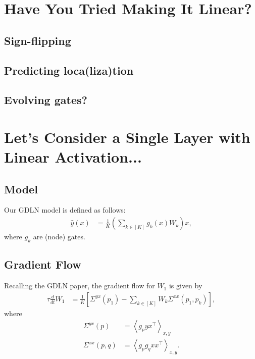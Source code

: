 \documentclass{article}
\begin{document}
\section{Have You Tried Making It Linear?}
\subsection{Sign-flipping}

\subsection{Predicting loca(liza)tion}

\subsection{Evolving gates?}


\section{Let's Consider a Single Layer with Linear Activation...}

\subsection{Model}
Our GDLN model is defined as follows:
\begin{align}
  \hat{y}(x) &= \frac{1}{K} \left( \sum_{k \in [K]} g_k(x) W_k \right) x, \label{eq:gdln_model}
\end{align}
where $g_k$ are (node) gates.

\subsection{Gradient Flow}
Recalling the GDLN paper, the gradient flow for $W_1$ is given by
\begin{align}
  \tau \frac{d}{dt} W_1 &= \frac{1}{K} \left[ \Sigma^{yx}(p_1) - \sum_{k \in [K]} W_k \Sigma^{xx}(p_1,p_k) \right], \label{eq:grad_flow}
\end{align}
where
\begin{align}
  \Sigma^{yx}(p) &= \left\langle g_p y x^\top \right\rangle_{x,y} \\
  \Sigma^{xx}(p,q) &= \left\langle g_p g_q x x^\top \right\rangle_{x,y}.
\end{align}
\end{document}
